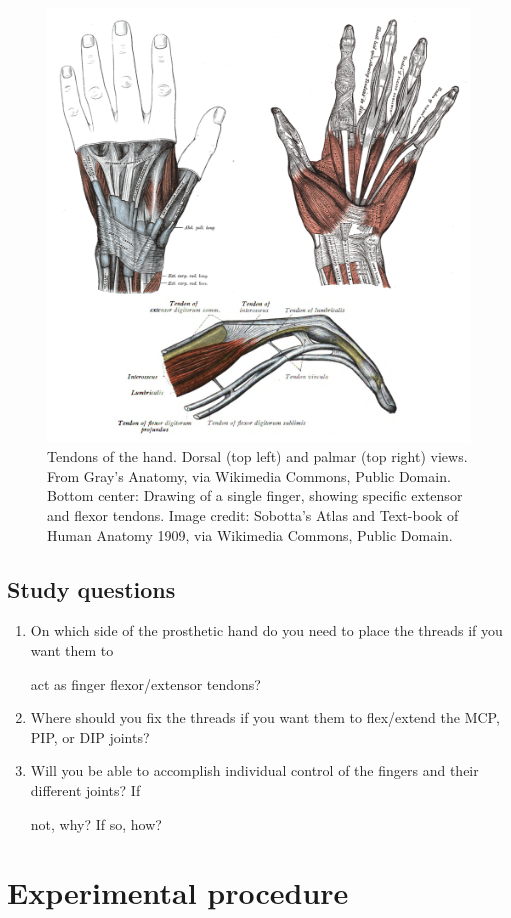 \documentclass{article}
\begin{document}
\begin{figure}[!htbp]
\centering
\includegraphics[width=0.7\linewidth]{files/EPpXta8zJdzN048lz8AR-198b50dfe4a0831985ee6ca2f0f5e8fd.png}
\caption[]{Tendons of the hand. Dorsal (top left) and palmar (top right) views. From Gray's Anatomy, via Wikimedia Commons, Public Domain. Bottom center: Drawing of a single finger, showing specific extensor and flexor tendons. Image credit: Sobotta's Atlas and Text-book of Human Anatomy 1909, via Wikimedia Commons, Public Domain.}
\label{cLezcHezN0}
\end{figure}

\subsection{Study questions}

\begin{enumerate}
\item On which side of the prosthetic hand do you need to place the threads if you want them to

act as finger flexor/extensor tendons?


\item Where should you fix the threads if you want them to flex/extend the MCP, PIP, or DIP joints?


\item Will you be able to accomplish individual control of the fingers and their different joints? If

not, why? If so, how?
\end{enumerate}

\section{Experimental procedure}
\end{document}
